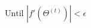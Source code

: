 \documentclass[preview]{standalone}
\begin{document}
\begin{align*}
\text{Until } |f'(\Theta^{(t)})| < \epsilon
\end{align*}
\end{document}
